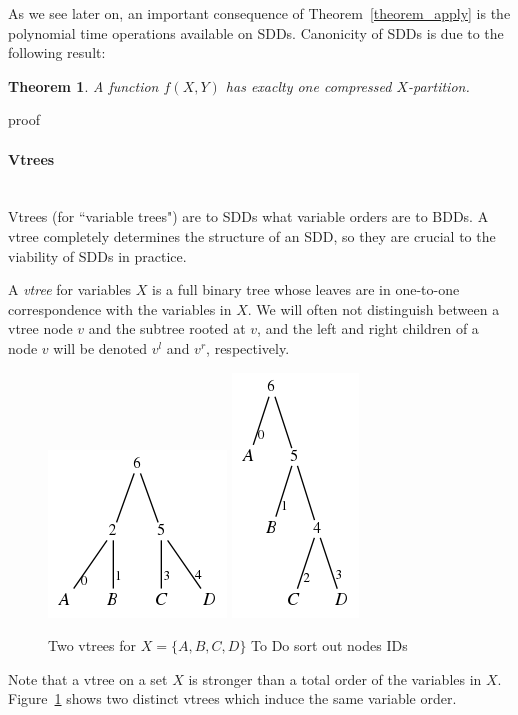 \documentclass[11pt]{article}
\newtheorem{theorem}{Theorem}[section]
\newenvironment{proof}[1][Proof]{\begin{trivlist}
\item[\hskip \labelsep {\bfseries #1}]}{\end{trivlist}}
\newenvironment{definition}[1][Definition]{\begin{trivlist}
\item[\hskip \labelsep {\bfseries #1}]}{\end{trivlist}}
\newcommand{\myparagraph}[1]{\paragraph{#1}\mbox{}\\}
\begin{document}
As we see later on, an important consequence of Theorem~\ref{theorem_apply} is the polynomial time operations available on SDDs. Canonicity of SDDs is due to the following result:

\begin{theorem}
\label{unique_compressed}
A function $f(X, Y)$ has exaclty one compressed $X$-partition.
\end{theorem}
\begin{proof}
proof
\end{proof}

\myparagraph{Vtrees}

Vtrees (for ``variable trees") are to SDDs what variable orders are to BDDs. A vtree completely determines the structure of an SDD, so they are crucial to the viability of SDDs in practice.

\begin{definition}
A \textit{vtree} for variables $X$ is a full binary tree whose leaves are in one-to-one correspondence with the  variables in $X$. We will often not distinguish between a vtree node $v$ and the subtree rooted at $v$, and the left and right children of a node $v$ will be denoted $v^l$ and $v^r$, respectively.
\end{definition}

\begin{figure}
\centering
\includegraphics[scale=0.5]{balancedABCD.png}
\qquad
\includegraphics[scale=0.5]{rightlinearABCD.png}


\caption{Two vtrees for $X = \{A, B, C, D\}$ To Do sort out nodes IDs}
\label{fig:vtree_examples} 

\end{figure}
Note that a vtree on a set $X$ is stronger than a total order of the variables in $X$. Figure~\ref{fig:vtree_examples} shows two distinct vtrees which induce the same variable order. 
\end{document}
